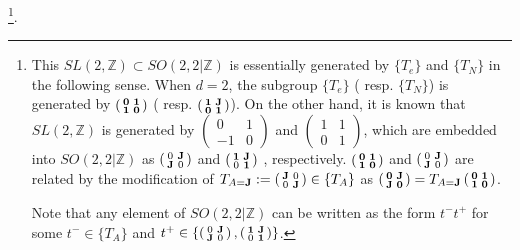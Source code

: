 \documentclass[a4paper,12pt]{article}
\newcommand{\Z}{{\mathbb{Z}}}
\newcommand{\bps}{\begin{smallmatrix}}
\newcommand{\eps}{\end{smallmatrix}}
\def \J{{\bf J}}
\def \l{{\frak l}}
\def \l({\left(}
\def \r){\right)}
\def \0{{\bf 0}}
\def \1{{\bf 1}}
\begin{document}
\footnote{This $SL(2,\Z)\subset SO(2,2 |\Z)$ is essentially generated 
by $\{T_e\}$ and $\{T_N\}$ in the following sense. 
When $d=2$, the subgroup $\{T_e\}$ ( resp. $\{T_N\}$) is generated by 
\begin{math}\l( \bps \0& \1\\ \1& \0\eps \r)\end{math} 
( resp. \begin{math} \l( \bps \1&\J\\ \0&\1\eps \r)\end{math}). 
On the other hand, it is known that $SL(2,\Z)$ is generated by 
\begin{math}\l( \bps 0&1\\ -1&0\eps \r) \end{math} and 
\begin{math}\l( \bps 1&1\\ 0&1 \eps \r) \end{math}, which are embedded 
into $SO(2,2 |\Z)$ as 
\begin{math}\l( \bps 0&\J\\ \J&0\eps \r)\end{math} and 
\begin{math}\l( \bps {\bf 1}&\J\\ 0&{\bf 1}\eps \r)\end{math} 
, respectively. 
\begin{math}\l( \bps \0& \1\\ \1& \0\eps \r)\end{math} and 
\begin{math}\l( \bps 0&\J\\ \J&0\eps \r)\end{math} are related by 
the modification of 
\begin{math} T_{A=\J}:=\l( \bps \J &0\\ 0&\J\eps \r) \in\{T_A\}\end{math} 
as \begin{math}\l( \bps \0&\J\\ \J&\0\eps \r)=T_{A=\J}
\l( \bps \0& \1\\ \1& \0\eps \r)\end{math}. 

Note that any element of $SO(2,2|\Z)$ can be written 
as the form $t^-t^+$ for some $t^-\in \{T_A\}$ and 
\begin{math}t^+\in \{\l( \bps 0&\J\\ \J&0\eps \r), 
\l( \bps {\bf 1}&\J\\ 0&{\bf 1}\eps \r)\}\end{math}. }. 
\end{document}
